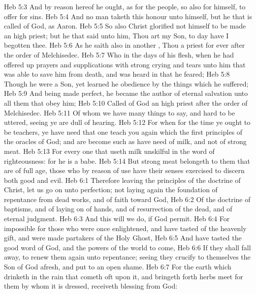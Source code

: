 \vs Heb 5:3 And by reason hereof he ought, as for the people, so also for himself, to offer for sins.
\vs Heb 5:4 And no man taketh this honour unto himself, but he that is called of God, as  Aaron.
\vs Heb 5:5 So also Christ glorified not himself to be made an high priest; but he that said unto him, Thou art my Son, to day have I begotten thee.
\vs Heb 5:6 As he saith also in another , Thou  a priest for ever after the order of Melchisedec.
\vs Heb 5:7 Who in the days of his flesh, when he had offered up prayers and supplications with strong crying and tears unto him that was able to save him from death, and was heard in that he feared;
\vs Heb 5:8 Though he were a Son, yet learned he obedience by the things which he suffered;
\vs Heb 5:9 And being made perfect, he became the author of eternal salvation unto all them that obey him;
\vs Heb 5:10 Called of God an high priest after the order of Melchisedec.
\vs Heb 5:11 Of whom we have many things to say, and hard to be uttered, seeing ye are dull of hearing.
\vs Heb 5:12 For when for the time ye ought to be teachers, ye have need that one teach you again which  the first principles of the oracles of God; and are become such as have need of milk, and not of strong meat.
\vs Heb 5:13 For every one that useth milk  unskilful in the word of righteousness: for he is a babe.
\vs Heb 5:14 But strong meat belongeth to them that are of full age,  those who by reason of use have their senses exercised to discern both good and evil.
\vs Heb 6:1 Therefore leaving the principles of the doctrine of Christ, let us go on unto perfection; not laying again the foundation of repentance from dead works, and of faith toward God,
\vs Heb 6:2 Of the doctrine of baptisms, and of laying on of hands, and of resurrection of the dead, and of eternal judgment.
\vs Heb 6:3 And this will we do, if God permit.
\vs Heb 6:4 For  impossible for those who were once enlightened, and have tasted of the heavenly gift, and were made partakers of the Holy Ghost,
\vs Heb 6:5 And have tasted the good word of God, and the powers of the world to come,
\vs Heb 6:6 If they shall fall away, to renew them again unto repentance; seeing they crucify to themselves the Son of God afresh, and put  to an open shame.
\vs Heb 6:7 For the earth which drinketh in the rain that cometh oft upon it, and bringeth forth herbs meet for them by whom it is dressed, receiveth blessing from God:
